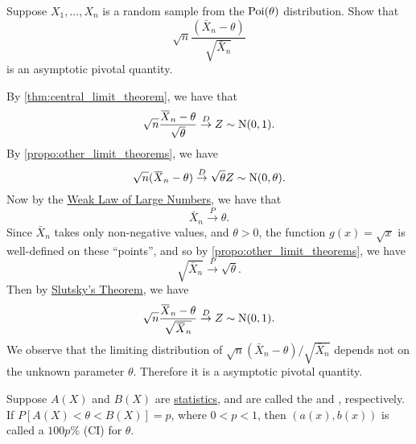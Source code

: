 \documentclass[notoc,notitlepage]{tufte-book}
\newcommand{\convd}{\overset{D}{\to}}
\newcommand{\convp}{\overset{P}{\to}}
\begin{document}
\begin{eg}
  Suppose $X_1, ..., X_n$ is a random sample from the $\operatorname{Poi}(\theta)$ distribution. Show that
  \begin{equation*}
    \sqrt{n} \frac{(\bar{X}_n - \theta)}{\sqrt{\bar{X}_n}}
  \end{equation*}
  is an asymptotic pivotal quantity.
\end{eg}

\begin{solution}
  By \cref{thm:central_limit_theorem}, we have that
  \begin{equation*}
    \sqrt{n} \frac{\bar{X}_n - \theta}{\sqrt{\theta}} \convd Z \sim \Nor(0, 1).
  \end{equation*}
  By \cref{propo:other_limit_theorems}, we have
  \begin{equation*}
    \sqrt{n} ( \bar{X}_n - \theta ) \convd \sqrt{\theta} Z \sim \Nor(0, \theta).
  \end{equation*}
  Now by the \hyperref[eg:weak_law_of_large_numbers]{Weak Law of Large Numbers}, we have that
  \begin{equation*}
    \bar{X}_n \convp \theta.
  \end{equation*}
  Since $\bar{X}_n$ takes only non-negative values, and $\theta > 0$, the function $g(x) = \sqrt{x}$ is well-defined on these ``points'', and so by \cref{propo:other_limit_theorems}, we have
  \begin{equation*}
    \sqrt{\bar{X}_n} \convp \sqrt{\theta}.
  \end{equation*}
  Then by \hyperref[propo:other_limit_theorems]{Slutsky's Theorem}, we have
  \begin{equation*}
    \sqrt{n} \frac{\bar{X}_n - \theta}{\sqrt{\bar{X}_n}} \convd Z \sim \Nor(0, 1).
  \end{equation*}
  We observe that the limiting distribution of $\sqrt{n}(\bar{X}_n - \theta) / \sqrt{\bar{X}_n}$ depends not on the unknown parameter $\theta$. Therefore it is a asymptotic pivotal quantity.
\end{solution}

\begin{defn}
\label{defn:confidence_interval}
  Suppose $A(X)$ and $B(X)$ are \hyperref[defn:statistic]{statistics}, and are called the  and , respectively. If $P[A(X) < \theta < B(X)] = p$, where $0 < p < 1$, then $(a(x), b(x))$ is called a $100p\%$  (CI) for $\theta$.
\end{defn}
\end{document}
